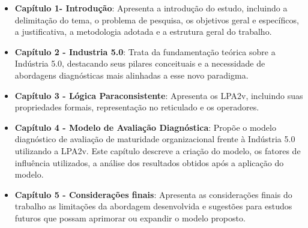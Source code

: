 \begin{itemize}
    \item \textbf{Capítulo 1- Introdução}: Apresenta a introdução do estudo, incluindo a delimitação do tema, o problema de pesquisa, os objetivos geral e específicos, a justificativa, a metodologia adotada e a estrutura geral do trabalho.
    
    \item \textbf{Capítulo 2 - Industria 5.0}: Trata da fundamentação teórica sobre a Indústria 5.0, destacando seus pilares conceituais e a necessidade de abordagens diagnósticas mais alinhadas a esse novo paradigma.
    
    \item \textbf{Capítulo 3 - Lógica Paraconsistente}: Apresenta os \gls{LPA2v}, incluindo suas propriedades formais, representação no reticulado e os operadores.
    
    \item \textbf{Capítulo 4 - Modelo de Avaliação Diagnóstica}: Propõe o modelo diagnóstico de avaliação de maturidade organizacional frente à Indústria 5.0 utilizando a \gls{LPA2v}. Este capítulo descreve a criação do modelo, os fatores de influência utilizados, a análise dos resultados obtidos após a aplicação do modelo.
    
    \item \textbf{Capítulo 5 - Considerações finais}: Apresenta as considerações finais do trabalho as limitações da abordagem desenvolvida e sugestões para estudos futuros que possam aprimorar ou expandir o modelo proposto.
\end{itemize}

